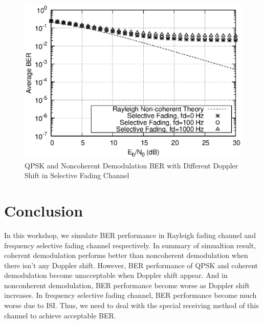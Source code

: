 \documentclass[technicalreport]{ieicej}
\begin{document}
\begin{figure}[H]
	\begin{center}
		\vspace{0cm}
		\includegraphics[width=\linewidth,clip]{fig/select.eps}
		\caption{QPSK and Noncoherent Demodulation BER with Different Doppler Shift in Selective Fading Channel}
		\label{fig:sample}
	\end{center}
\end{figure}

\section{Conclusion}
In this workshop, we simulate BER performance in Rayleigh fading channel and frequency selective fading channel respectively. In summary of simualtion result, coherent demodulation performs better than noncoherent demodulation when there isn't any Doppler shift. However, BER performance of QPSK and coherent demodulation become unacceptable when Doppler shift appear. And in nonconherent demodulation, BER performance become worse as Doppler shift increases. In frequency selective fading channel, BER performance become much worse due to ISI. Thus, we need to deal with the special receiving method of this channel to achieve acceptable BER.



\end{document}
